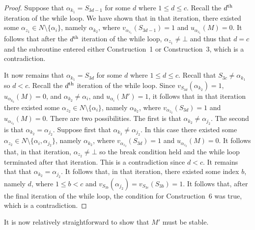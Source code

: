 \begin{proof}
Suppose that $\alpha_{k_1}=S_{3d-1}$ for some $d$ where $1\leq d\leq c$. Recall the $d\textsuperscript{th}$ iteration of the while loop. We have shown that in that iteration, there existed some $\alpha_{z_1} \in N\setminus \{ \alpha_i \}$, namely $\alpha_{k_2}$, where $v_{\alpha_{z_1}}(S_{3d-1})=1$ and $u_{\alpha_{z_1}}(M)=0$. It follows that after the $d\textsuperscript{th}$ iteration of the while loop, $\alpha_{z_1} \neq \bot$ and thus that $d = c$ and the subroutine entered either Construction~1 or Construction~3, which is a contradiction.

It now remains that $\alpha_{k_1}=S_{3d}$ for some $d$ where $1\leq d \leq c$. Recall that $S_{3c} \neq \alpha_{k_1}$ so $d < c$. Recall the $d\textsuperscript{th}$ iteration of the while loop. Since $v_{S_{3d}}(\alpha_{k_2})=1$, $u_{\alpha_{k_2}}(M)=0$, and $\alpha_{k_2}\neq \alpha_i$, and $u_{\alpha_i}(M')=1$, it follows that in that iteration there existed some $\alpha_{z_2} \in N\setminus \{ \alpha_i \}$, namely $\alpha_{k_2}$, where $v_{\alpha_{z_2}}(S_{3d})=1$ and $u_{\alpha_{z_2}}(M)=0$. There are two possibilities. The first is that $\alpha_{k_2} \neq \alpha_{j_2}$. The second is that $\alpha_{k_2} = \alpha_{j_2}$. Suppose first that $\alpha_{k_2}\neq \alpha_{j_2}$. In this case there existed some $\alpha_{z_2} \in N\setminus \{ \alpha_i, \alpha_{j_2} \}$, namely $\alpha_{k_2}$, where $v_{\alpha_{z_2}}(S_{3d})=1$ and $u_{\alpha_{z_2}}(M)=0$. It follows that, in that iteration, $\alpha_{z_2}\neq \bot$ so the break condition held and the while loop terminated after that iteration. This is a contradiction since $d < c$. It remains that that $\alpha_{k_2} = \alpha_{j_2}$. It follows that, in that iteration, there existed some index $b$, namely $d$, where $1\leq b < c$ and $v_{S_{3b}}(\alpha_{j_2})=v_{S_{3c}}(S_{3b})=1$. It follows that, after the final iteration of the while loop, the condition for Construction~6 was true, which is a contradiction.
\end{proof}

It is now relatively straightforward to show that $M'$ must be stable.

